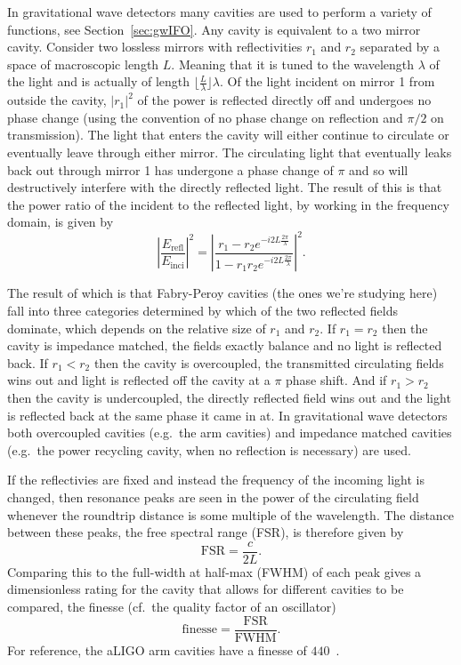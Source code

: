 \documentclass[aps,pra,superscriptaddress,reprint,nofootinbib]{revtex4-1}
\newcommand{\abs}[1]{\left\lvert #1 \right\rvert}
\begin{document}
In gravitational wave detectors many cavities are used to perform a variety of functions, see Section~\ref{sec:gwIFO}. Any cavity is equivalent to a two mirror cavity. Consider two lossless mirrors with reflectivities $r_1$ and $r_2$ separated by a space of macroscopic length $L$. Meaning that it is tuned to the wavelength $\lambda$ of the light and is actually of length $\lfloor \frac{L}{\lambda} \rfloor \lambda$. Of the light incident on mirror 1 from outside the cavity, $\abs{r_1}^2$ of the power is reflected directly off and undergoes no phase change (using the convention of no phase change on reflection and $\pi/2$ on transmission). The light that enters the cavity will either continue to circulate or eventually leave through either mirror. The circulating light that eventually leaks back out through mirror 1 has undergone a phase change of $\pi$ and so will destructively interfere with the directly reflected light. The result of this is that the power ratio of the incident to the reflected light, by working in the frequency domain, is given by~\cite{Danilishin_2012}
$$\abs{\frac{E_{\mathrm{refl}}}{E_{\mathrm{inci}}}}^2 = \abs{\frac{r_1 - r_2 e^{-i 2 L \frac{2\pi}{\lambda}}}{1- r_1 r_2 e^{-i 2 L \frac{2\pi}{\lambda}}}}^2.$$ 

The result of which is that Fabry-Peroy cavities (the ones we’re studying here) fall into three categories determined by which of the two reflected fields dominate, which depends on the relative size of $r_1$ and $r_2$. If $r_1 = r_2$ then the cavity is impedance matched, the fields exactly balance and no light is reflected back. If $r_1 < r_2$ then the cavity is overcoupled, the transmitted circulating fields wins out and light is reflected off the cavity at a $\pi$ phase shift. And if $r_1 > r_2$ then the cavity is undercoupled, the directly reflected field wins out and the light is reflected back at the same phase it came in at. In gravitational wave detectors both overcoupled cavities (e.g.\ the arm cavities) and impedance matched cavities (e.g.\ the power recycling cavity, when no reflection is necessary) are used.


If the reflectivies are fixed and instead the frequency of the incoming light is changed, then resonance peaks are seen in the power of the circulating field whenever the roundtrip distance is some multiple of the wavelength. The distance between these peaks, the free spectral range (FSR), is therefore given by $$\mathrm{FSR} = \frac{c}{2L}.$$ Comparing this to the full-width at half-max (FWHM) of each peak gives a dimensionless rating for the cavity that allows for different cavities to be compared, the finesse (cf.\ the quality factor of an oscillator) $$\mathrm{finesse} = \frac{\mathrm{FSR}}{\mathrm{FWHM}}.$$ For reference, the aLIGO arm cavities have a finesse of $440$~\cite{AdvancedLIGO:2015}.
\end{document}
